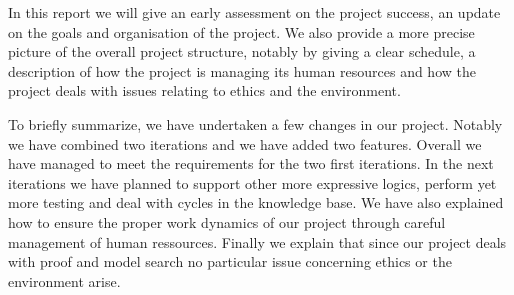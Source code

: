 In this report we will give an early assessment on the project success, an update on the goals and organisation of the project. We also provide a more precise picture of the overall project structure, notably by giving a clear schedule, a description of how the project is managing its human resources and how the project deals with issues relating to ethics and the environment.

To briefly summarize, we have undertaken a few changes in our project. Notably we have combined two iterations and we have added two features. Overall we have managed to meet the requirements for the two first iterations. In the next iterations we have planned to support other more expressive logics, perform yet more testing and deal with cycles in the knowledge base. We have also explained how to ensure the proper work dynamics of our project through careful management of human ressources. Finally we explain that since our project deals with proof and model search no particular issue concerning ethics or the environment arise.
